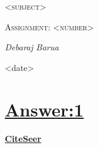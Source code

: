\documentclass[10pt,a4paper]{article}
\begin{document}
\begin{titlepage}
\centering

	{\scshape\LARGE <subject>\par}
	
	{\scshape\Large Assignment: <number>\par}

	\vfill
	
	\vfill
	{\Large\itshape Debaraj Barua\par}
	\vfill
		
	{\large <date>\par}
\end{titlepage}
\tableofcontents

\newpage
\section*{\underline{Answer:1}}
\begin{center}
\underline{\textbf{CiteSeer}} ~\cite{Nobody06}
\end{center}

\newpage



\end{document}
